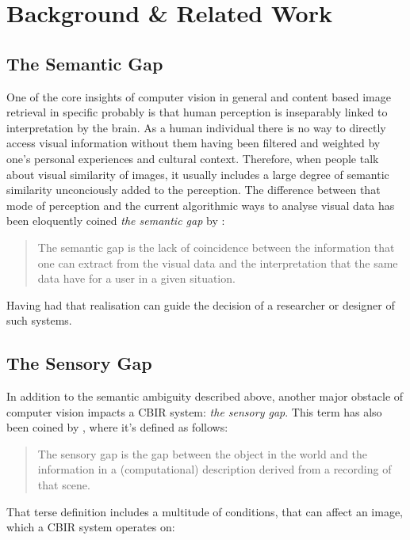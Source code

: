 \chapter{Background \& Related Work}\label{ch:background}

\section{The Semantic Gap}
One of the core insights of computer vision in general and content based image
retrieval in specific probably is that human perception is inseparably linked
to interpretation by the brain. As a human individual there is no way to
directly access visual information without them having been filtered and
weighted by one's personal experiences and cultural context. Therefore, when
people talk about visual similarity of images, it usually includes a large
degree of semantic similarity unconciously added to the perception. The
difference between that mode of perception and the current algorithmic ways to
analyse visual data has been eloquently coined \emph{the semantic gap} by
\autocite{smeulders_content-based_2000}:

\begin{quote}
The semantic gap is the lack of coincidence between the information that one
can extract from the visual data and the interpretation that the same data have
for a user in a given situation.
\end{quote}

Having had that realisation can guide the decision of a researcher or designer
of such systems.

\section{The Sensory Gap}
In addition to the semantic ambiguity described above, another major obstacle
of computer vision impacts a CBIR system: \emph{the sensory gap}. This term has
also been coined by \autocite{smeulders_content-based_2000}, where it's defined
as follows:

\begin{quote}
The sensory gap is the gap between the object in the world and the information
in a (computational) description derived from a recording of that scene.
\end{quote}

That terse definition includes a multitude of conditions, that can affect an
image, which a CBIR system operates on:

